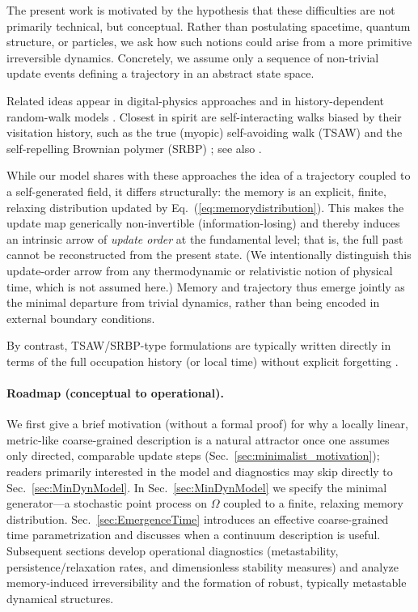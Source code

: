 \documentclass[reprint,amsmath,amssymb,aps,prd,nofootinbib,floatfix]{revtex4-2}
\begin{document}
The present work is motivated by the hypothesis that these difficulties are not primarily technical, but conceptual.
Rather than postulating spacetime, quantum structure, or particles, we ask how such notions could arise from a more primitive irreversible dynamics.
Concretely, we assume only a sequence of non-trivial update events defining a trajectory in an abstract state space.

Related ideas appear in digital-physics approaches \cite{Wolfram2002,tHooft2016} and in history-dependent random-walk models \cite{Nelson1966,Pemantle2007,BenAImRaimond2002}.
Closest in spirit are self-interacting walks biased by their visitation history, such as the true (myopic) self-avoiding walk (TSAW) \cite{AmitParisiPeliti1983,TothWerner1998} and the self-repelling Brownian polymer (SRBP) \cite{DurrettRogers1992}; see also \cite{PelitiPietronero1987}.

While our model shares with these approaches the idea of a trajectory coupled to a self-generated field, it differs structurally: the memory is an explicit, finite, relaxing distribution updated by Eq.~(\ref{eq:memorydistribution}). This makes the update map generically non-invertible (information-losing) and thereby induces an intrinsic arrow of \emph{update order} at the fundamental level; that is, the full past cannot be reconstructed from the present state. (We intentionally distinguish this update-order arrow from any thermodynamic or relativistic notion of physical time, which is not assumed here.)
Memory and trajectory thus emerge jointly as the minimal departure from trivial dynamics, rather than being encoded in external boundary conditions.

By contrast, TSAW/SRBP-type formulations are typically written directly in terms of the full occupation history (or local time) without explicit forgetting \cite{AmitParisiPeliti1983,TothWerner1998,DurrettRogers1992,PelitiPietronero1987}.

\paragraph{Roadmap (conceptual to operational).}
We first give a brief motivation (without a formal proof) for why a locally linear, metric-like coarse-grained description is a natural attractor once one assumes only directed, comparable update steps (Sec.~\ref{sec:minimalist_motivation}); readers primarily interested in the model and diagnostics may skip directly to Sec.~\ref{sec:MinDynModel}.
In Sec.~\ref{sec:MinDynModel} we specify the minimal generator---a stochastic point process on $\Omega$ coupled to a finite, relaxing memory distribution.
Sec.~\ref{sec:EmergenceTime} introduces an effective coarse-grained time parametrization and discusses when a continuum description is useful.
Subsequent sections develop operational diagnostics (metastability, persistence/relaxation rates, and dimensionless stability measures) and analyze memory-induced irreversibility and the formation of robust, typically metastable dynamical structures.
\end{document}
